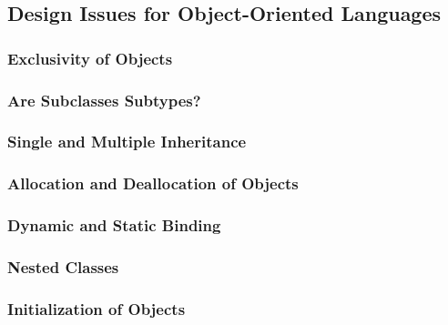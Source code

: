 \subsection{Design Issues for Object-Oriented Languages}\label{subsec:OOP_Design_Issues}
\subsubsection{Exclusivity of Objects}\label{subsubsec:OOP_Object_Exclusivity}
\subsubsection{Are Subclasses Subtypes?}\label{subsubsec:OOP_Subclasses_Subtypes}
\subsubsection{Single and Multiple Inheritance}\label{subsubsec:OOP_Single_Multiple_Inheritance}
\subsubsection{Allocation and Deallocation of Objects}\label{subsubsec:OOP_Object_Allocation_Deallocation}
\subsubsection{Dynamic and Static Binding}\label{subsubsec:OOP_Dynamic_Static_Binding}
\subsubsection{Nested Classes}\label{subsubsec:OOP_Nested_Classes}
\subsubsection{Initialization of Objects}\label{subsubsec:OOP_Object_Initialization}

